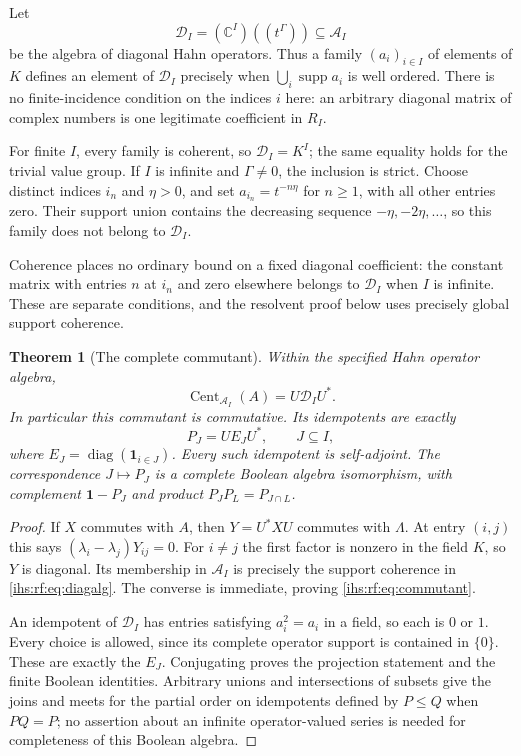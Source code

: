 \documentclass[11pt,a4paper]{article}
\numberwithin{equation}{section}
\newtheorem{theorem}{Theorem}[section]
\theoremstyle{definition}
\theoremstyle{remark}
\newcommand{\C}{\mathbb C}
\newcommand{\K}{K}
\newcommand{\Arf}{\mathcal A_I}
\newcommand{\Dg}{\mathcal D_I}
\newcommand{\supp}{\operatorname{supp}}
\newcommand{\diag}{\operatorname{diag}}
\newcommand{\Cent}{\operatorname{Cent}}
\newcommand{\Id}{\mathbf 1}
\begin{document}
Let
\begin{equation}\label{ihs:rf:eq:diagalg}
 \Dg=(\C^I)((t^\Gamma))\subseteq\Arf
\end{equation}
be the algebra of diagonal Hahn operators. Thus a family $(a_i)_{i\in I}$ of
elements of $\K$ defines an element of $\Dg$ precisely when
$\bigcup_i\supp a_i$ is well ordered. There is no finite-incidence condition
on the indices $i$ here: an arbitrary diagonal matrix of complex numbers is
one legitimate coefficient in $R_I$.

For finite $I$, every family is coherent, so $\Dg=\K^I$; the same equality
holds for the trivial value group. If $I$ is infinite and $\Gamma\ne0$,
the inclusion is strict. Choose distinct indices $i_n$ and $\eta>0$, and
set $a_{i_n}=t^{-n\eta}$ for $n\ge1$, with all other entries zero. Their
support union contains the decreasing sequence $-\eta,-2\eta,\ldots$,
so this family does not belong to $\Dg$.

Coherence places no ordinary bound on a fixed diagonal coefficient:
the constant matrix with entries $n$ at $i_n$ and zero elsewhere belongs
to $\Dg$ when $I$ is infinite. These are separate conditions, and the
resolvent proof below uses precisely global support coherence.

\begin{theorem}[The complete commutant]\label{ihs:rf:thm:commutant}
Within the specified Hahn operator algebra,
\begin{equation}\label{ihs:rf:eq:commutant}
 \Cent_{\Arf}(A)=U\Dg U^*.
\end{equation}
In particular this commutant is commutative. Its idempotents are exactly
\begin{equation}\label{ihs:rf:eq:PJ}
 P_J=UE_JU^*,\qquad J\subseteq I,
\end{equation}
where $E_J=\diag(\mathbf 1_{i\in J})$. Every such idempotent is
self-adjoint. The correspondence $J\mapsto P_J$ is a complete Boolean
algebra isomorphism, with complement $\Id-P_J$ and product
$P_JP_L=P_{J\cap L}$.
\end{theorem}
\begin{proof}
If $X$ commutes with $A$, then $Y=U^*XU$ commutes with $\Lambda$. At entry
$(i,j)$ this says $(\lambda_i-\lambda_j)Y_{ij}=0$. For $i\ne j$ the first
factor is nonzero in the field $\K$, so $Y$ is diagonal. Its membership in
$\Arf$ is precisely the support coherence in \eqref{ihs:rf:eq:diagalg}. The
converse is immediate, proving \eqref{ihs:rf:eq:commutant}.

An idempotent of $\Dg$ has entries satisfying $a_i^2=a_i$ in a field, so
each is $0$ or $1$. Every choice is allowed, since its complete operator
support is contained in $\{0\}$. These are exactly the $E_J$. Conjugating
proves the projection statement and the finite Boolean identities. Arbitrary
unions and intersections of subsets give the joins and meets for the partial
order on idempotents defined by $P\le Q$ when $PQ=P$; no assertion about an
infinite operator-valued series is needed for completeness of this Boolean
algebra.
\end{proof}
\end{document}
